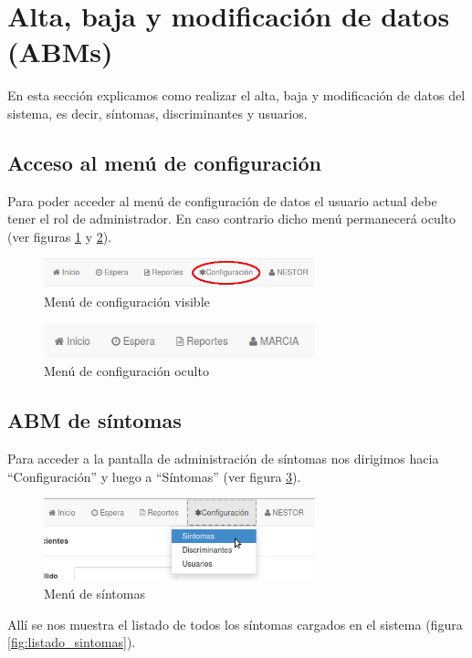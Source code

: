 \section{Alta, baja y modificación de datos (ABMs)}
En esta sección explicamos como realizar el alta, baja y modificación de datos del sistema, es decir, síntomas, discriminantes y usuarios.

\subsection{Acceso al menú de configuración}
Para poder acceder al menú de configuración de datos el usuario actual debe tener el rol de administrador. En caso contrario dicho menú permanecerá oculto (ver figuras \ref{fig:menu_conf_visible} y \ref{fig:menu_conf_oculto}).

\begin{figure}
\centerline{\includegraphics[width=0.7\textwidth]{menu_configuracion_visible.png}}
\caption{Menú de configuración visible}
\label{fig:menu_conf_visible}
\end{figure}

\begin{figure}
\centerline{\includegraphics[width=0.7\textwidth]{menu_configuracion_oculto.png}}
\caption{Menú de configuración oculto}
\label{fig:menu_conf_oculto}
\end{figure}

\subsection{ABM de síntomas}
Para acceder a la pantalla de administración de síntomas nos dirigimos hacia ``Configuración'' y luego a ``Síntomas'' (ver figura \ref{fig:menu_sintomas}).
\begin{figure}
\centerline{\includegraphics[width=0.7\textwidth]{menu_sintomas.png}}
\caption{Menú de síntomas}
\label{fig:menu_sintomas}
\end{figure}
Allí se nos muestra el listado de todos los síntomas cargados en el sistema (figura \ref{fig:listado_sintomas}).


